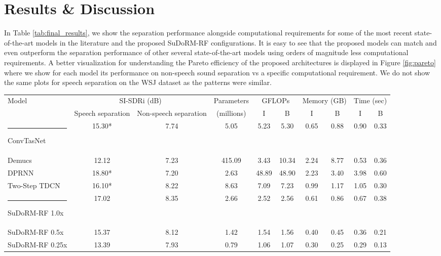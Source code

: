 \documentclass{article}
\makeatletter
\def\hlinewd#1{\noalign{\ifnum0=`}\fi\hrule \@height #1 \futurelet
   \reserved@a\@xhline}
\theoremstyle{definition}
\newcommand{\sudo}{SuDoRM-RF }
\newcommand{\sudol}{SuDoRM-RF 1.0x }
\newcommand{\sudom}{SuDoRM-RF 0.5x }
\newcommand{\sudos}{SuDoRM-RF 0.25x }
\makeatother
\begin{document}
\section{Results \& Discussion}
\label{sec:results}
In Table \ref{tab:final_results}, we show the separation performance alongside computational requirements for some of the most recent state-of-the-art models in the literature and the proposed \sudo configurations. It is easy to see that the proposed models can match and even outperform the separation performance of other several state-of-the-art models using orders of magnitude less computational requirements. A better visualization for understanding the Pareto efficiency of the proposed architectures is displayed in Figure \ref{fig:pareto} where we show for each model its performance on non-speech sound separation vs a specific computational requirement. We do not show the same plots for speech separation on the WSJ dataset as the patterns were similar.  
\begin{table*}[!t]
    \centering
    \begin{tabular}{l|c|c|c|cc|cc|cc}
\toprule
\multirow{2}{*}{Model} & \multicolumn{2}{c|}{SI-SDRi (dB)} & Parameters & \multicolumn{2}{c|}{GFLOPs} & \multicolumn{2}{c|}{Memory (GB)} & \multicolumn{2}{c|}{Time (sec)} \\
 & Speech separation & Non-speech separation & (millions)& I & B & I & B & I & B\\
\hlinewd{1pt}
ConvTasNet \cite{luo2019convTasNet} & 15.30* & 7.74 & 5.05 & 5.23 & 5.30 & 0.65 & 0.88 & 0.90 & 0.33 \\
Demucs \cite{defossez2019demucs} & 12.12 & 7.23 & 415.09 & 3.43 & 10.34 & 2.24 & 8.77 & 0.53 & 0.36 \\
DPRNN \cite{luo2019dual} & 18.80* & 7.20 & 2.63 & 48.89 & 48.90 & 2.23 & 3.40 & 3.98 & 0.60 \\
Two-Step TDCN \cite{tzinis2019two} & 16.10* & 8.22 & 8.63 & 7.09 & 7.23 & 0.99 & 1.17 & 1.05 & 0.30 \\
\hlinewd{1pt}
\sudol & 17.02 & 8.35 & 2.66 & 2.52 & 2.56 & 0.61 & 0.86 & 0.67 & 0.38 \\
\sudom & 15.37 & 8.12 & 1.42 & 1.54 & 1.56 & 0.40 & 0.45 & 0.36 & 0.21 \\
\sudos & 13.39 & 7.93 & 0.79 & 1.06 & 1.07 & 0.30 & 0.25 & 0.29 & 0.13 \\
\bottomrule
\end{tabular}
\caption{SI-SDRi separation performance for all models on both separation tasks (speech and non-speech) alongside their computational requirements for performing inference on CPU (I) and a backward update step on GPU (B) for one second of input audio or equivalently  samples. * We assign the maximum SI-SDRi performance obtained by our runs and the reported number on the corresponding paper.}
\label{tab:final_results}
\end{table*}
\end{document}
